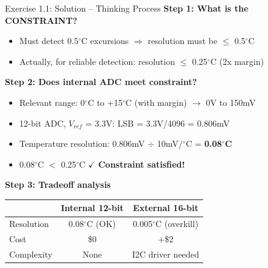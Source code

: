 \documentclass[aspectratio=169,11pt]{beamer}
\begin{document}
\begin{frame}{Exercise 1.1: Solution -- Thinking Process}
    \textbf{Step 1: What is the CONSTRAINT?}
    \begin{itemize}
        \item Must detect 0.5$^\circ$C excursions $\Rightarrow$ resolution must be $\leq$ 0.5$^\circ$C
        \item Actually, for reliable detection: resolution $\leq$ 0.25$^\circ$C (2x margin)
    \end{itemize}
    
    \vspace{0.2cm}
    \textbf{Step 2: Does internal ADC meet constraint?}
    \begin{itemize}
        \item Relevant range: 0$^\circ$C to +15$^\circ$C (with margin) $\rightarrow$ 0V to 150mV
        \item 12-bit ADC, $V_{ref}$ = 3.3V: LSB = 3.3V/4096 = 0.806mV
        \item Temperature resolution: 0.806mV $\div$ 10mV/$^\circ$C = \textbf{0.08$^\circ$C}
        \item 0.08$^\circ$C $<$ 0.25$^\circ$C $\checkmark$ \textbf{Constraint satisfied!}
    \end{itemize}
    
    \vspace{0.2cm}
    \textbf{Step 3: Tradeoff analysis}
    \begin{center}
    \begin{tabular}{lcc}
        \toprule
        & \textbf{Internal 12-bit} & \textbf{External 16-bit} \\
        \midrule
        Resolution & 0.08$^\circ$C (OK) & 0.005$^\circ$C (overkill) \\
        Cost & \$0 & +\$2 \\
        Complexity & None & I2C driver needed \\
        \bottomrule
    \end{tabular}
    \end{center}
\end{frame}
\end{document}
